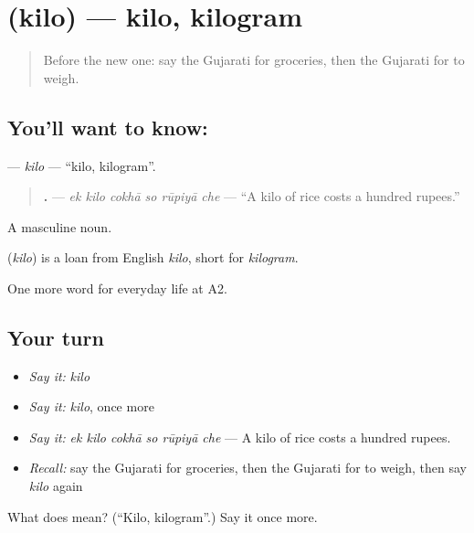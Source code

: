 \section[\texorpdfstring{\gu{કિલો} (kilo)}{કિલો (kilo)}]{ (kilo) — kilo, kilogram}

\label{lesson:GU-C183-kilo}



\begin{quote}
Before the new one: say the Gujarati for groceries, then the Gujarati for to weigh.
\end{quote}

\subsection*{You'll want to know: }
\textbf{} — \emph{kilo} — \textquotedblleft{}kilo, kilogram\textquotedblright{}.

\begin{quote}
\textbf{     .} — \emph{ek kilo cokhā so rūpiyā che} — \textquotedblleft{}A kilo of rice costs a hundred rupees.\textquotedblright{}
\end{quote}

A masculine noun.

\begin{cousinweb}
\textbf{} (\emph{kilo}) is a loan from English \emph{kilo}, short for \emph{kilogram}.
\end{cousinweb}

\begin{grammarlens}[title={What you've built}]
One more word for everyday life at A2.
\end{grammarlens}

\subsection*{Your turn}
\begin{itemize}
\raggedright
  \item \emph{Say it:} \emph{kilo}
  \item \emph{Say it:} \emph{kilo}, once more
  \item \emph{Say it:} \emph{ek kilo cokhā so rūpiyā che} — A kilo of rice costs a hundred rupees.
  \item \emph{Recall:} say the Gujarati for groceries, then the Gujarati for to weigh, then say \emph{kilo} again
\end{itemize}

\begin{tcolorbox}[breakable,colback=teal!4,colframe=teal!35!black,title={Before you move on}]
What does  mean? (\textquotedblleft{}Kilo, kilogram\textquotedblright{}.) Say it once more.
\end{tcolorbox}
